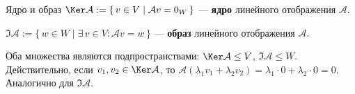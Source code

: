 \begin{Definition}{Ядро и образ}{}
  $\Ker\mathcal{A} := \{\, v \in V \mid \mathcal{A}v = 0_W \,\}$ --- \textbf{ядро} линейного отображения $\mathcal{A}$.
  
 $\Im\mathcal{A} := \{\, w \in W \mid \exists\, v \in V \colon \mathcal{A}v = w \,\}$ --- 	\textbf{образ} линейного отображения $\mathcal{A}$.
\end{Definition}
Оба множества являются подпространствами: $\Ker\mathcal{A} \leq V$, $\Im\mathcal{A} \leq W$. Действительно, если $v_1, v_2 \in \Ker\mathcal{A}$, то $\mathcal{A}(\lambda_1v_1 + \lambda_2v_2) = \lambda_1\cdot0 + \lambda_2\cdot0 = 0$. Аналогично для $\Im\mathcal{A}$.
